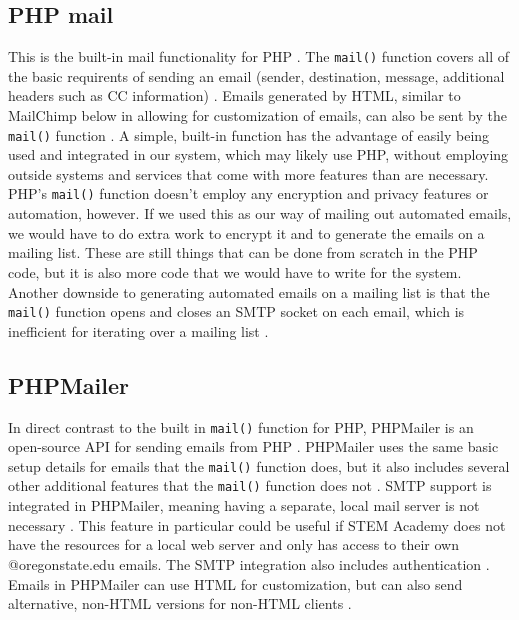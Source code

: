 \documentclass[letterpaper,10pt,serif, draftclsnofoot,onecolumn, compsoc, titlepage]{IEEEtran}
\begin{document}
\subsection{PHP mail}
This is the built-in mail functionality for PHP \cite{php_mail}.
The \texttt{mail()} function covers all of the basic requirents of sending an email (sender, destination, message, additional headers such as CC information) \cite{php_mail}.
Emails generated by HTML, similar to MailChimp below in allowing for customization of emails, can also be sent by the \texttt{mail()} function \cite{php_mail}.
A simple, built-in function has the advantage of easily being used and integrated in our system, which may likely use PHP, without employing outside systems and services that come with more features than are necessary.
PHP's \texttt{mail()} function doesn't employ any encryption and privacy features or automation, however.
If we used this as our way of mailing out automated emails, we would have to do extra work to encrypt it and to generate the emails on a mailing list.
These are still things that can be done from scratch in the PHP code, but it is also more code that we would have to write for the system.
Another downside to generating automated emails on a mailing list is that the \texttt{mail()} function opens and closes an SMTP socket on each email, which is inefficient for iterating over a mailing list \cite{php_mail}.
\subsection{PHPMailer}
In direct contrast to the built in \texttt{mail()} function for PHP, PHPMailer is an open-source API for sending emails from PHP \cite{phpmailer}.
PHPMailer uses the same basic setup details for emails that the \texttt{mail()} function does, but it also includes several other additional features that the \texttt{mail()} function does not \cite{phpmailer}.
SMTP support is integrated in PHPMailer, meaning having a separate, local mail server is not necessary \cite{phpmailer}.
This feature in particular could be useful if STEM Academy does not have the resources for a local web server and only has access to their own @oregonstate.edu emails.
The SMTP integration also includes authentication \cite{phpmailer}.
Emails in PHPMailer can use HTML for customization, but can also send alternative, non-HTML versions for non-HTML clients \cite{phpmailer}.
\end{document}
